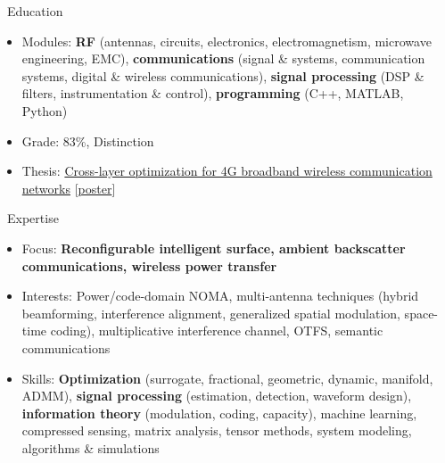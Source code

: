 \documentclass{cv}
\begin{document}
\begin{section}{\faUniversity\ Education}
	\begin{itemize}[rightmargin=60pt]
		\item Modules: \textbf{RF} (antennas, circuits, electronics, electromagnetism, microwave engineering, EMC), \textbf{communications} (signal \& systems, communication systems, digital \& wireless communications), \textbf{signal processing} (DSP \& filters, instrumentation \& control), \textbf{programming} (C++, MATLAB, Python)
		\item Grade: 83\%, Distinction
		\item Thesis: \href{https://cloud.snowztail.com/s/7dyLXmkxKwfdWNx}{Cross-layer optimization for 4G broadband wireless communication networks} [\href{https://cloud.snowztail.com/s/3g7cDQ6x4DfLB6G}{poster}]
	\end{itemize}
\end{section}

\vspace{-1.5em}

\begin{section}{\faThumbsUp\ Expertise}
	\begin{itemize}
		\item Focus: \textbf{Reconfigurable intelligent surface, ambient backscatter communications, wireless power transfer}
		\item Interests: Power/code-domain NOMA, multi-antenna techniques (hybrid beamforming, interference alignment, generalized spatial modulation, space-time coding), multiplicative interference channel, OTFS, semantic communications
		\item Skills: \textbf{Optimization} (surrogate, fractional, geometric, dynamic, manifold, ADMM), \textbf{signal processing} (estimation, detection, waveform design), \textbf{information theory} (modulation, coding, capacity), machine learning, compressed sensing, matrix analysis, tensor methods, system modeling, algorithms \& simulations
	\end{itemize}
\end{section}

\vspace{-1.5em}
\end{document}
